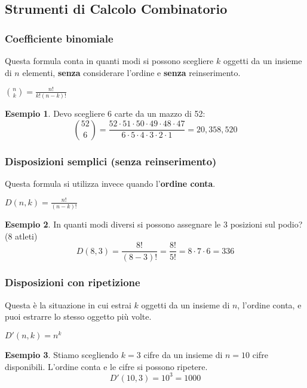 \documentclass[a4paper, 11pt]{article}
\theoremstyle{definition}
\newtheorem{esempio}{Esempio}[section]
\begin{document}
\subsection{Strumenti di Calcolo Combinatorio}

\subsubsection{Coefficiente binomiale}
Questa formula conta in quanti modi si possono scegliere $k$ oggetti da un insieme di $n$ elementi, \textbf{senza} considerare l'ordine e \textbf{senza} reinserimento.
\begin{formulabox}
    $\binom{n}{k} = \frac{n!}{k!(n-k)!}$
\end{formulabox}
\begin{esempio}
Devo scegliere 6 carte da un mazzo di 52:
\[ \binom{52}{6} = \frac{52 \cdot 51 \cdot 50 \cdot 49 \cdot 48 \cdot 47}{6 \cdot 5 \cdot 4 \cdot 3 \cdot 2 \cdot 1} = 20,358,520 \]
\end{esempio}

\subsubsection{Disposizioni semplici (senza reinserimento)}
Questa formula si utilizza invece quando l'\textbf{ordine conta}.
\begin{formulabox}
    $D(n,k) = \frac{n!}{(n-k)!}$
\end{formulabox}
\begin{esempio}
In quanti modi diversi si possono assegnare le 3 posizioni sul podio? (8 atleti)
\[ D(8,3) = \frac{8!}{(8-3)!} = \frac{8!}{5!} = 8 \cdot 7 \cdot 6 = 336 \]
\end{esempio}

\subsubsection{Disposizioni con ripetizione}
Questa è la situazione in cui estrai $k$ oggetti da un insieme di $n$, l'ordine conta, e puoi estrarre lo stesso oggetto più volte.
\begin{formulabox}
    $D'(n,k) = n^k$
\end{formulabox}
\begin{esempio}
Stiamo scegliendo $k=3$ cifre da un insieme di $n=10$ cifre disponibili. L'ordine conta e le cifre si possono ripetere.
\[ D'(10,3) = 10^3 = 1000 \]
\end{esempio}
\end{document}
